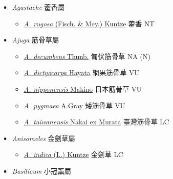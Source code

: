 
  \begin{itemize}
 \item[] \textit{Agastache} 藿香屬
                                
  \begin{itemize}
        \item[] \href{http://www.theplantlist.org/tpl1.1/search?q=Agastache+rugosa}{\textit{A. rugosa} (Fisch. \& Mey.) Kuntze}   藿香   NT
  \end{itemize}
 \item[] \textit{Ajuga} 筋骨草屬
                                
  \begin{itemize}
        \item[] \href{http://www.theplantlist.org/tpl1.1/search?q=Ajuga+decumbens}{\textit{A. decumbens} Thunb.}   匍伏筋骨草   NA (N)
        \item[] \href{http://www.theplantlist.org/tpl1.1/search?q=Ajuga+dictyocarpa}{\textit{A. dictyocarpa} Hayata}   網果筋骨草   VU
        \item[] \href{http://www.theplantlist.org/tpl1.1/search?q=Ajuga+nipponensis}{\textit{A. nipponensis} Makino}   日本筋骨草   VU
        \item[] \href{http://www.theplantlist.org/tpl1.1/search?q=Ajuga+pygmaea}{\textit{A. pygmaea} A.Gray}   矮筋骨草   VU
        \item[] \href{http://www.theplantlist.org/tpl1.1/search?q=Ajuga+taiwanensis}{\textit{A. taiwanensis} Nakai ex Murata}   臺灣筋骨草   LC
  \end{itemize}
 \item[] \textit{Anisomeles} 金劍草屬
                                
  \begin{itemize}
        \item[] \href{http://www.theplantlist.org/tpl1.1/search?q=Anisomeles+indica}{\textit{A. indica} (L.) Kuntze}   金劍草   LC
  \end{itemize}
 \item[] \textit{Basilicum} 小冠薰屬
                                

\end{itemize}
